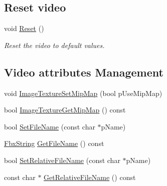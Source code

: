\subsection*{Reset video}
\begin{DoxyCompactItemize}
\item 
void \hyperlink{class_fbx_video_a135c575d14d2ba47c901920687f0e52c}{Reset} ()
\begin{DoxyCompactList}\small\item\em Reset the video to default values. \end{DoxyCompactList}\end{DoxyCompactItemize}
\subsection*{Video attributes Management}
\begin{DoxyCompactItemize}
\item 
void \hyperlink{class_fbx_video_ae041331c4f831b2b55e87b4581047d74}{Image\+Texture\+Set\+Mip\+Map} (bool p\+Use\+Mip\+Map)
\item 
bool \hyperlink{class_fbx_video_a71d943f108e39aa4bdec2a55d7d2468a}{Image\+Texture\+Get\+Mip\+Map} () const
\item 
bool \hyperlink{class_fbx_video_a897a450c62670d4730cb9ee663a26ea2}{Set\+File\+Name} (const char $\ast$p\+Name)
\item 
\hyperlink{class_fbx_string}{Fbx\+String} \hyperlink{class_fbx_video_a96fc2a11e4e7ca89230389bb55ca5466}{Get\+File\+Name} () const
\item 
bool \hyperlink{class_fbx_video_a3217bac3585954766fa2c56a10de48f3}{Set\+Relative\+File\+Name} (const char $\ast$p\+Name)
\item 
const char $\ast$ \hyperlink{class_fbx_video_a5c99c225a47e6aae4cd3028f2737babb}{Get\+Relative\+File\+Name} () const
\end{DoxyCompactItemize}
